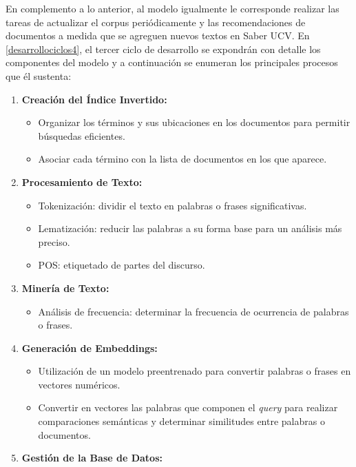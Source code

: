 \documentclass[
  12pt,
  openany]{book}
\providecommand{\tightlist}{%
  \setlength{\itemsep}{0pt}\setlength{\parskip}{0pt}}
\begin{document}
En complemento a lo anterior, al modelo igualmente le corresponde realizar las tareas de actualizar el corpus periódicamente y las recomendaciones de documentos a medida que se agreguen nuevos textos en Saber UCV. En \ref{desarrollociclos4}, el tercer ciclo de desarrollo se expondrán con detalle los componentes del modelo y a continuación se enumeran los principales procesos que él sustenta:

\begin{enumerate}
\def\labelenumi{\arabic{enumi}.}
\item
  \textbf{Creación del Índice Invertido:}

  \begin{itemize}
  \item
    Organizar los términos y sus ubicaciones en los documentos para permitir búsquedas eficientes.
  \item
    Asociar cada término con la lista de documentos en los que aparece.
  \end{itemize}
\item
  \textbf{Procesamiento de Texto:}

  \begin{itemize}
  \item
    Tokenización: dividir el texto en palabras o frases significativas.
  \item
    Lematización: reducir las palabras a su forma base para un análisis más preciso.
  \item
    POS: etiquetado de partes del discurso.
  \end{itemize}
\item
  \textbf{Minería de Texto:}

  \begin{itemize}
  \tightlist
  \item
    Análisis de frecuencia: determinar la frecuencia de ocurrencia de palabras o frases.
  \end{itemize}
\item
  \textbf{Generación de Embeddings:}

  \begin{itemize}
  \item
    Utilización de un modelo preentrenado para convertir palabras o frases en vectores numéricos.
  \item
    Convertir en vectores las palabras que componen el \emph{query} para realizar comparaciones semánticas y determinar similitudes entre palabras o documentos.
  \end{itemize}
\item
  \textbf{Gestión de la Base de Datos:}


\end{enumerate}
\end{document}
